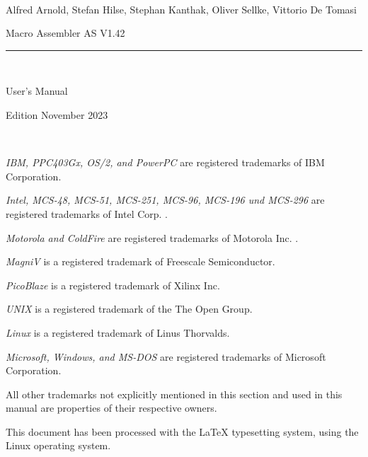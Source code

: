 \documentclass[12pt,twoside]{report}
\newcommand{\asname}{{AS}}
\begin{document}
\thispagestyle{empty}

\
\vspace{7cm}\par

\begin{raggedright}
{\large Alfred Arnold, Stefan Hilse, Stephan Kanthak, Oliver
 Sellke, Vittorio De Tomasi}
\vspace{1cm}\par
{\huge Macro Assembler \asname{} V1.42}\\
\rule{9.5cm}{0.3mm}\\
\vspace{2mm}\par
{\huge User's Manual}

\vspace{1cm}\par

{\large Edition November 2023}
\end{raggedright}

\clearpage
\thispagestyle{empty}

\ \vspace{5cm}

{\em IBM, PPC403Gx, OS/2, and PowerPC} are registered trademarks of IBM
Corporation.

{\em Intel, MCS-48, MCS-51, MCS-251, MCS-96, MCS-196 und MCS-296} are
registered trademarks of Intel Corp. .

{\em Motorola and ColdFire} are registered trademarks of Motorola Inc. .

{\em MagniV} is a registered trademark of Freescale Semiconductor.

{\em PicoBlaze} is a registered trademark of Xilinx Inc.

{\em UNIX} is a registered trademark of the The Open Group.

{\em Linux} is a registered trademark of Linus Thorvalds.

{\em Microsoft, Windows, and MS-DOS} are registered trademarks of
Microsoft Corporation.

All other trademarks not explicitly mentioned in this section and used in
this manual are properties of their respective owners.

\vspace{5cm}

This document has been processed with the LaTeX typesetting system, using
the Linux operating system.

\clearpage

\end{document}
